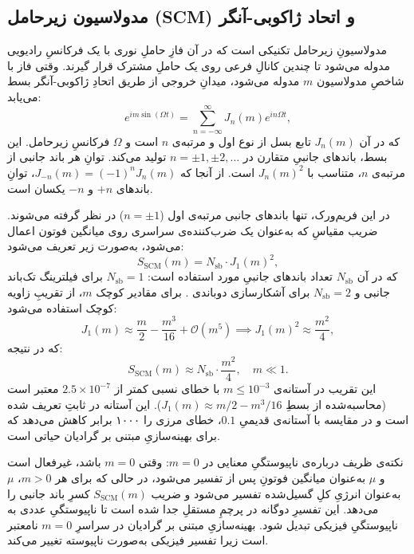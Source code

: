 \subsection{مدولاسیون زیرحامل (SCM) و اتحاد ژاکوبی-آنگر}

مدولاسیونِ زیرحامل  تکنیکی است که در آن فازِ حاملِ نوری با یک فرکانسِ رادیویی مدوله می‌شود تا چندین کانالِ فرعی روی یک حاملِ مشترک قرار گیرند. وقتی فاز با شاخصِ مدولاسیون $m$ مدوله می‌شود، میدانِ خروجی از طریق اتحادِ ژاکوبی-آنگر بسط می‌یابد:
\begin{equation}
	e^{i m \sin(\Omega t)} = \sum_{n=-\infty}^{\infty} J_n(m) e^{i n \Omega t},
	\label{eq:jacobi-anger}
\end{equation}
که در آن $J_n(m)$ تابع بسل از نوع اول و مرتبه‌ی $n$ است و $\Omega$ فرکانسِ زیرحامل. این بسط، باند‌های جانبیِ متقارن در $n = \pm 1, \pm 2, \dots$ تولید می‌کند. توانِ هر باند جانبی از مرتبه‌ی $n$، متناسب با $J_n(m)^2$ است. از آنجا که $J_{-n}(m) = (-1)^n J_n(m)$، توانِ باندهای $+n$ و $-n$ یکسان است.

در این فریم‌ورک، تنها باندهای جانبی مرتبه‌ی اول ($n = \pm 1$) در نظر گرفته می‌شوند. ضریب مقیاسِ  که به‌عنوان یک ضرب‌کننده‌ی سراسری روی میانگین فوتون اعمال می‌شود، به‌صورت زیر تعریف می‌شود:
\begin{equation}
	S_{\text{SCM}}(m) = N_{\text{sb}} \cdot J_1(m)^2,
	\label{eq:scm-exact}
\end{equation}
که در آن $N_{\text{sb}}$ تعداد باندهای جانبیِ مورد استفاده است: $N_{\text{sb}} = 1$ برای فیلترینگ تک‌باند جانبی  و $N_{\text{sb}} = 2$ برای آشکارسازی دو‌باندی . برای مقادیر کوچک $m$، از تقریبِ زاویه کوچک استفاده می‌شود:
\begin{equation}
	J_1(m) \approx \frac{m}{2} - \frac{m^3}{16} + \mathcal{O}(m^5) \implies J_1(m)^2 \approx \frac{m^2}{4},
	\label{eq:bessel-small-angle}
\end{equation}
که در نتیجه:
\begin{equation}
	S_{\text{SCM}}(m) \approx N_{\text{sb}} \cdot \frac{m^2}{4}, \quad m \ll 1.
	\label{eq:scm-small-angle}
\end{equation}
این تقریب در آستانه‌ی $m \leq 10^{-3}$ با خطای نسبی کمتر از $2.5 \times 10^{-7}$ معتبر است (محاسبه‌شده از بسطِ $J_1(m) \approx m/2 - m^3/16$). این آستانه در ثابتِ  تعریف شده است و در مقایسه با آستانه‌ی قدیمیِ $0.1$، خطای مرزی را ۱۰۰۰ برابر کاهش می‌دهد که برای بهینه‌سازیِ مبتنی بر گرادیان حیاتی است.

نکته‌ی ظریف درباره‌ی ناپیوستگیِ معنایی در $m = 0$: وقتی $m = 0$ باشد،  غیرفعال است و $\mu$ به‌عنوان میانگین فوتونِ پس از  تفسیر می‌شود، در حالی که برای هر $m > 0$، $\mu$ به‌عنوان انرژیِ کلِ گسیل‌شده تفسیر می‌شود و ضریب $S_{\text{SCM}}(m)$ کسرِ باند جانبی را می‌دهد. این تفسیرِ دوگانه در پرچمِ مستقلِ  جدا شده است تا ناپیوستگیِ عددی به ناپیوستگیِ فیزیکی تبدیل شود. بهینه‌سازیِ مبتنی بر گرادیان در سراسرِ $m = 0$ نامعتبر است زیرا تفسیر فیزیکی به‌صورت ناپیوسته تغییر می‌کند.

